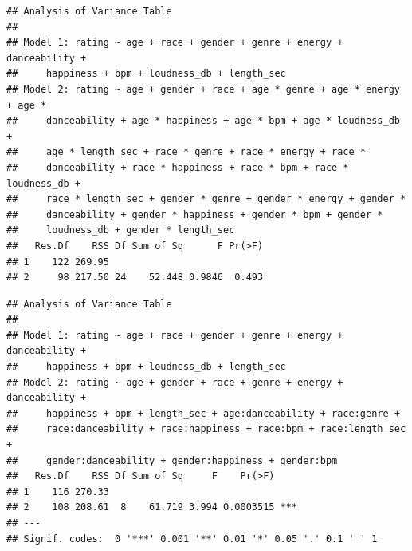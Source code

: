 \documentclass[
]{article}
\newenvironment{Shaded}{\begin{snugshade}}{\end{snugshade}}
\newcommand{\FunctionTok}[1]{\textcolor[rgb]{0.13,0.29,0.53}{\textbf{#1}}}
\newcommand{\NormalTok}[1]{#1}
\newcommand{\SpecialCharTok}[1]{\textcolor[rgb]{0.81,0.36,0.00}{\textbf{#1}}}
\newcommand{\StringTok}[1]{\textcolor[rgb]{0.31,0.60,0.02}{#1}}
\begin{document}
\begin{verbatim}
## Analysis of Variance Table
## 
## Model 1: rating ~ age + race + gender + genre + energy + danceability + 
##     happiness + bpm + loudness_db + length_sec
## Model 2: rating ~ age + gender + race + age * genre + age * energy + age * 
##     danceability + age * happiness + age * bpm + age * loudness_db + 
##     age * length_sec + race * genre + race * energy + race * 
##     danceability + race * happiness + race * bpm + race * loudness_db + 
##     race * length_sec + gender * genre + gender * energy + gender * 
##     danceability + gender * happiness + gender * bpm + gender * 
##     loudness_db + gender * length_sec
##   Res.Df    RSS Df Sum of Sq      F Pr(>F)
## 1    122 269.95                           
## 2     98 217.50 24    52.448 0.9846  0.493
\end{verbatim}

\begin{Shaded}
\end{Shaded}

\begin{verbatim}
## Analysis of Variance Table
## 
## Model 1: rating ~ age + race + gender + genre + energy + danceability + 
##     happiness + bpm + loudness_db + length_sec
## Model 2: rating ~ age + gender + race + genre + energy + danceability + 
##     happiness + bpm + length_sec + age:danceability + race:genre + 
##     race:danceability + race:happiness + race:bpm + race:length_sec + 
##     gender:danceability + gender:happiness + gender:bpm
##   Res.Df    RSS Df Sum of Sq     F    Pr(>F)    
## 1    116 270.33                                 
## 2    108 208.61  8    61.719 3.994 0.0003515 ***
## ---
## Signif. codes:  0 '***' 0.001 '**' 0.01 '*' 0.05 '.' 0.1 ' ' 1
\end{verbatim}

\begin{Shaded}
\end{Shaded}
\end{document}
